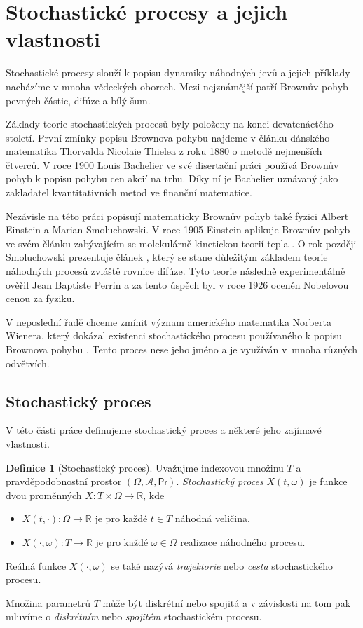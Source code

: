 \documentclass[a4paper,12pt]{report}
\theoremstyle{definition} \newtheorem{definice}[veta]{Definice}
\theoremstyle{remark}
\begin{document}
\section{Stochastické procesy a jejich vlastnosti}
Stochastické procesy slouží k popisu dynamiky náhodných jevů a jejich příklady nacházíme v mnoha vědeckých oborech.
Mezi nejznámější patří Brownův pohyb pevných částic, difúze a bílý šum.

Základy teorie stochastických procesů byly položeny na konci devatenáctého století.
První zmínky popisu Brownova pohybu najdeme v článku dánského matematika Thorvalda Nicolaie Thielea z roku 1880 o metodě nejmenších čtverců.
V roce 1900 Louis Bachelier ve své disertační práci \cite{bachelier} používá Brownův pohyb k popisu pohybu cen akcií na trhu.
Díky ní je Bachelier uznávaný jako zakladatel kvantitativních metod ve finanční matematice.

Nezávisle na této práci popisují matematicky Brownův pohyb také fyzici Albert Einstein a Marian Smoluchowski. 
V roce 1905 Einstein aplikuje Brownův pohyb ve svém článku zabývajícím se molekulárně kinetickou teorií tepla \cite{einstein}.
O rok později Smoluchowski prezentuje článek \cite{Smoluchowski}, který se stane důležitým základem teorie náhodných procesů zvláště rovnice difúze.
Tyto teorie následně experimentálně ověřil Jean Baptiste Perrin a za tento úspěch byl v roce 1926 oceněn Nobelovou cenou za fyziku. 

V neposlední řadě chceme zmínit význam amerického matematika Norberta Wienera, který dokázal existenci stochastického procesu používaného k popisu Brownova pohybu \cite{wiener1923differential}. 
Tento proces nese jeho jméno a je využíván v~mnoha různých odvětvích.

\subsection{Stochastický proces}
V této části práce definujeme stochastický proces a některé jeho zajímavé vlastnosti.
\begin{definice}[Stochastický proces]
Uvažujme  indexovou množinu $T$ a pravděpodobnostní prostor $(\Omega,\mathcal{A}, \mathsf{Pr})$.
\textit{Stochastický proces} $X(t,\omega)$ je funkce dvou proměnných $X:T\times\Omega\to\mathbb{R}$, kde
\begin{itemize}
\item $X(t,\cdot):\Omega\to\mathbb{R}$ je pro každé $t\in T$ náhodná veličina,
\item $X(\cdot,\omega):T\to\mathbb{R}$ je pro každé $\omega\in\Omega$ realizace náhodného procesu.
\end{itemize}
Reálná funkce $X(\cdot,\omega)$ se také nazývá \textit{trajektorie} nebo \textit{cesta} stochastického procesu. 
\end{definice}
Množina parametrů $T$ může být diskrétní nebo spojitá a v závislosti na tom pak mluvíme o \textit{diskrétním} nebo \textit{spojitém} stochastickém procesu. 
\end{document}
